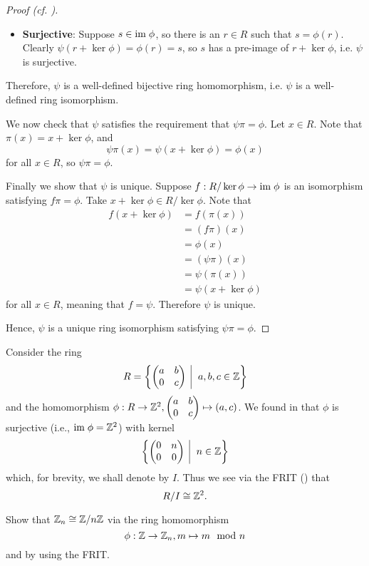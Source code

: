 \begin{proof}[Proof (cf. {\cite[p.~302, Factor Theorem For Rings]{cohn_1982}})]
\begin{itemize}
        \item \textbf{Surjective}: Suppose $s \in \mathrm{im}\;\phi$, so there is an $r \in R$ such that $s = \phi(r)$. Clearly $\psi(r + \ker\phi) = \phi(r) = s$, so $s$ has a pre-image of $r + \ker\phi$, i.e. $\psi$ is surjective.
    \end{itemize}
    Therefore, $\psi$ is a well-defined bijective ring homomorphism, i.e. $\psi$ is a well-defined ring isomorphism.

    We now check that $\psi$ satisfies the requirement that $\psi\pi = \phi$. Let $x \in R$. Note that $\pi(x) = x + \ker\phi$, and
    \[
        \psi\pi(x) = \psi(x + \ker\phi) = \phi(x)
    \]
    for all $x \in R$, so $\psi\pi = \phi$.

    Finally we show that $\psi$ is unique. Suppose $f: R/\ker\phi \to \mathrm{im}\;\phi$ is an isomorphism satisfying $f\pi=\phi$. Take $x + \ker\phi \in R/\ker\phi$. Note that
    \begin{align*}
        f(x + \ker\phi) &= f(\pi(x))\\
        &= (f\pi)(x)\\
        &= \phi(x)\\
        &= (\psi\pi)(x)\\
        &= \psi(\pi(x))\\
        &= \psi(x + \ker\phi)
    \end{align*}
    for all $x \in R$, meaning that $f = \psi$. Therefore $\psi$ is unique.

    Hence, $\psi$ is a unique ring isomorphism satisfying $\psi\pi = \phi$.
\end{proof}

\begin{example}
    Consider the ring
    \[
        R = \left\{\begin{pmatrix}a&b\\0&c\end{pmatrix}\vert a,b,c\in\Z\right\}
    \]
    and the homomorphism $\phi: R \to \mathbb{Z}^2, \begin{pmatrix}a&b\\0&c\end{pmatrix} \mapsto (a,c)$. We found in  that $\phi$ is surjective (i.e., $\mathrm{im}\;\phi = \mathbb{Z}^2$) with kernel
    \[
        \left\{\begin{pmatrix}0&n\\0&0\end{pmatrix} \vert n \in \Z\right\}
    \]
    which, for brevity, we shall denote by $I$. Thus we see via the FRIT () that
    \[
        R/I \cong \mathbb{Z}^2.
    \]
\end{example}
\begin{exercise}
    Show that $\mathbb{Z}_n \cong \mathbb{Z}/n\mathbb{Z}$ via the ring homomorphism
    \[
        \phi: \mathbb{Z} \to \mathbb{Z}_n, m \mapsto m \mod n
    \]
    and by using the FRIT.
\end{exercise}

